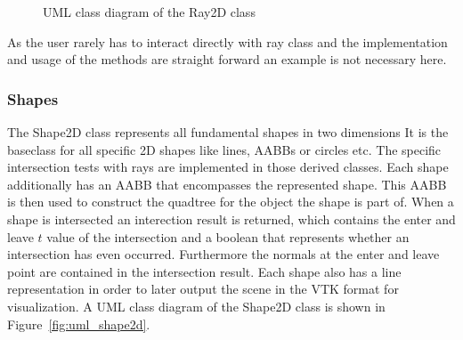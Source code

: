 \documentclass[a4paper,10pt]{article}
\newcommand{\figref}[1]{Figure~\ref{#1}}
\begin{document}
    \begin{center}
    \begin{figure}
    \centering
    \caption{UML class diagram of the Ray2D class}
    \label{fig:uml_ray2d}
    \end{figure}
    \end{center}

    As the user rarely has to interact directly with ray class and
    the implementation and usage of the methods are straight forward
    an example is not necessary here.
    
    \subsubsection{Shapes}

    The Shape2D class represents all fundamental shapes in two dimensions
    It is the baseclass for all specific 2D shapes like lines, AABBs or circles
    etc.
    The specific intersection tests with rays are implemented in those derived
    classes.
    Each shape additionally has an AABB that encompasses the represented
    shape.
    This AABB is then used to construct the quadtree for the object the shape
    is part of.
    When a shape is intersected an interection result is returned, which
    contains the enter and leave $t$ value of the intersection and a boolean
    that represents whether an intersection has even occurred.
    Furthermore the normals at the enter and leave point are contained
    in the intersection result.
    Each shape also has a line representation in order to later output
    the scene in the VTK format for visualization.
    A UML class diagram of the Shape2D class is shown in 
    \figref{fig:uml_shape2d}.
\end{document}
